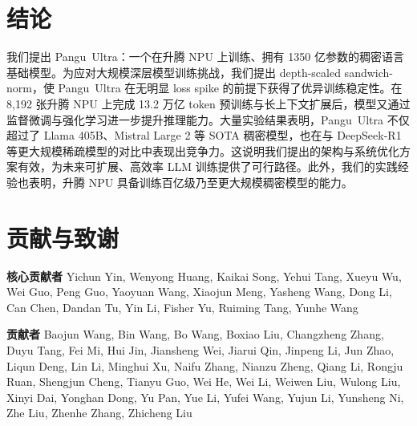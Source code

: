 \documentclass{article}
\newcommand{\pangu}{Pangu}
\newcommand{\modelname}{\pangu~Ultra}
\begin{document}






\section{结论}

我们提出 \modelname{}：一个在升腾 NPU 上训练、拥有 1350 亿参数的稠密语言基础模型。为应对大规模深层模型训练挑战，我们提出 depth-scaled sandwich-norm，使 \modelname{} 在无明显 loss spike 的前提下获得了优异训练稳定性。在 8,192 张升腾 NPU 上完成 13.2 万亿 token 预训练与长上下文扩展后，模型又通过监督微调与强化学习进一步提升推理能力。大量实验结果表明，\modelname{} 不仅超过了 Llama 405B、Mistral Large 2 等 SOTA 稠密模型，也在与 DeepSeek-R1 等更大规模稀疏模型的对比中表现出竞争力。这说明我们提出的架构与系统优化方案有效，为未来可扩展、高效率 LLM 训练提供了可行路径。此外，我们的实践经验也表明，升腾 NPU 具备训练百亿级乃至更大规模稠密模型的能力。




\newpage
\appendix
\section{贡献与致谢}



\noindent
\textbf{核心贡献者}
Yichun Yin, Wenyong Huang, Kaikai Song, Yehui Tang, Xueyu Wu, Wei Guo, Peng Guo, Yaoyuan Wang, Xiaojun Meng, Yasheng Wang, Dong Li, Can Chen, Dandan Tu, Yin Li, Fisher Yu, Ruiming Tang, Yunhe Wang

\textbf{贡献者}
Baojun Wang, Bin Wang, Bo Wang, Boxiao Liu, Changzheng Zhang, Duyu Tang, Fei Mi, Hui Jin, Jiansheng Wei, Jiarui Qin, Jinpeng Li, Jun Zhao, Liqun Deng, Lin Li, Minghui Xu, Naifu Zhang, Nianzu Zheng, Qiang Li, Rongju Ruan, Shengjun Cheng, Tianyu Guo, Wei He, Wei Li, Weiwen Liu, Wulong Liu, Xinyi Dai, Yonghan Dong, Yu Pan, Yue Li, Yufei Wang, Yujun Li, Yunsheng Ni, Zhe Liu, Zhenhe Zhang, Zhicheng Liu
\end{document}
